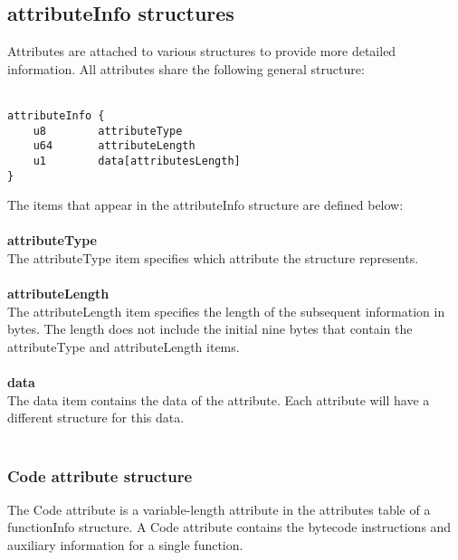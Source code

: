 \documentclass[12pt]{article}
\newcommand*{\formalfont}{\fontfamily{ptm}\selectfont}
\newcommand\tab[1][1cm]{\hspace*{#1}}
\begin{document}
		\subsection{attributeInfo structures}
			Attributes are attached to various structures to provide more detailed information. All attributes share the following general structure: \\ \\
			\begin{Verbatim}[frame=single]
attributeInfo {	
	u8        attributeType
	u64       attributeLength
	u1        data[attributesLength]
}
			\end{Verbatim}
			The items that appear in the {\formalfont attributeInfo} structure are defined below: \\ \\
			\textbf{attributeType} \\
				\tab The {\formalfont attributeType} item specifies which attribute the structure represents. \\ \\
			\textbf{attributeLength} \\
				\tab The {\formalfont attributeLength} item specifies the length of the subsequent information in bytes. The length does not include the initial nine bytes that contain the attributeType and attributeLength items. \\ \\
			\textbf{data} \\
				\tab The {\formalfont data} item contains the data of the attribute. Each attribute will have a different structure for this data. \\ \\
			
			\subsubsection{Code attribute structure}
				The Code attribute is a variable-length attribute in the attributes table of a functionInfo structure. A Code attribute contains the bytecode instructions and auxiliary information for a single function.
						
	
\end{document}
